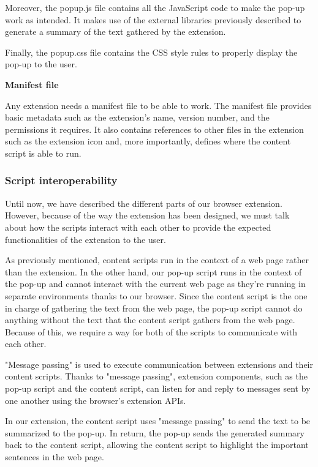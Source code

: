 \documentclass[conference,compsoc]{IEEEtran}
\begin{document}
Moreover, the popup.js file contains all the JavaScript code to make the pop-up work as intended.
It makes use of the external libraries previously described to generate a summary of the text gathered by the extension.

Finally, the popup.css file contains the CSS style rules to properly display the pop-up to the user.

\vspace{0.4cm}
\textbf{Manifest file}

Any extension needs a manifest file to be able to work.
The manifest file provides basic metadata such as the extension's name, version number, and the permissions it requires.
It also contains references to other files in the extension such as the extension icon and, more importantly, defines where the content script is able to run.


\subsubsection{Script interoperability}

Until now, we have described the different parts of our browser extension.
However, because of the way the extension has been designed, we must talk about how the scripts interact with each other to provide the expected functionalities of the extension to the user.

As previously mentioned, content scripts run in the context of a web page rather than the extension.
In the other hand, our pop-up script runs in the context of the pop-up and cannot interact with the current web page as they're running in separate environments thanks to our browser.
Since the content script is the one in charge of gathering the text from the web page, the pop-up script cannot do anything without the text that the content script gathers from the web page.
Because of this, we require a way for both of the scripts to communicate with each other.

"Message passing" is used to execute communication between extensions and their content scripts.
Thanks to "message passing", extension components, such as the pop-up script and the content script, can listen for and reply to messages sent by one another using the browser's extension APIs.

In our extension, the content script uses "message passing" to send the text to be summarized to the pop-up.
In return, the pop-up sends the generated summary back to the content script, allowing the content script to highlight the important sentences in the web page.
\end{document}
